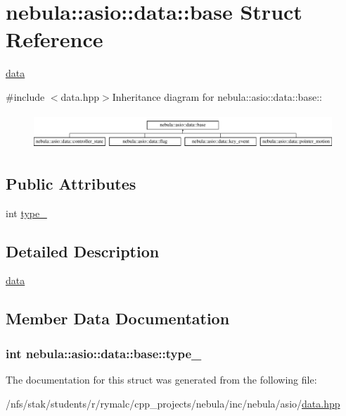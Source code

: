 \hypertarget{structnebula_1_1asio_1_1data_1_1base}{
\section{nebula::asio::data::base Struct Reference}
\label{structnebula_1_1asio_1_1data_1_1base}
}


\hyperlink{namespacenebula_1_1asio_1_1data}{data}  


{\ttfamily \#include $<$data.hpp$>$}Inheritance diagram for nebula::asio::data::base::\begin{figure}[H]
\begin{center}
\leavevmode
\includegraphics[height=1.33333cm]{structnebula_1_1asio_1_1data_1_1base}
\end{center}
\end{figure}
\subsection*{Public Attributes}
\begin{DoxyCompactItemize}
\item 
int \hyperlink{structnebula_1_1asio_1_1data_1_1base_a4f639cf1c92c5879783a49990a7a41f0}{type\_\-}
\end{DoxyCompactItemize}


\subsection{Detailed Description}
\hyperlink{namespacenebula_1_1asio_1_1data}{data} 

\subsection{Member Data Documentation}
\hypertarget{structnebula_1_1asio_1_1data_1_1base_a4f639cf1c92c5879783a49990a7a41f0}{
\subsubsection[{type\_\-}]{\setlength{\rightskip}{0pt plus 5cm}int {\bf nebula::asio::data::base::type\_\-}}}
\label{structnebula_1_1asio_1_1data_1_1base_a4f639cf1c92c5879783a49990a7a41f0}


The documentation for this struct was generated from the following file:\begin{DoxyCompactItemize}
\item 
/nfs/stak/students/r/rymalc/cpp\_\-projects/nebula/inc/nebula/asio/\hyperlink{data_8hpp}{data.hpp}\end{DoxyCompactItemize}
